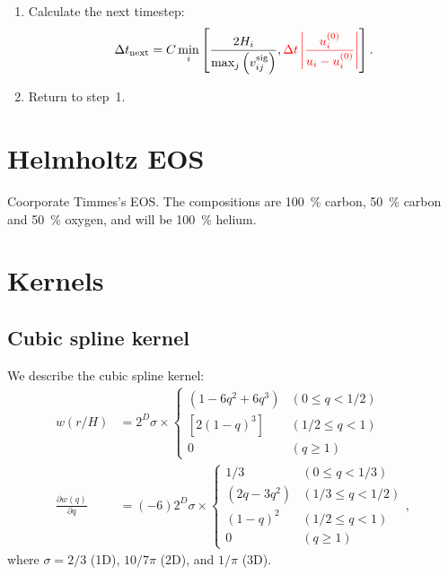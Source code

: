 \documentclass[fleqn,dvipdfmx]{article}
\newcommand{\redtext}[1]{\textcolor{red}{#1}}
\begin{document}
\begin{enumerate}
\item Calculate the next timestep:
  \begin{align}
    \Delta t_{\rm next} = C \min_i \left[ \frac{2H_i}{\max_j \left(
        v_{ij}^{\rm sig} \right) }, \redtext{\Delta t \left|
        \frac{u_i^{(0)}}{u_i-u_i^{(0)}} \right|} \right].
  \end{align}

\item Return to step~1.
\end{enumerate}

\section{Helmholtz EOS}

Coorporate Timmes's EOS. The compositions are 100~\% carbon, 50~\%
carbon and 50~\% oxygen, and will be 100~\% helium.

\appendix

\section{Kernels}
\label{sec:kernels}

\subsection{Cubic spline kernel}

We describe the cubic spline kernel:
\begin{align}
  w(r/H) &= 2^D \sigma \times \left\{
  \begin{array}{ll}
    \left( 1 - 6 q^2 + 6 q^3 \right) & (0 \le q < 1/2) \\
    \left[ 2 (1 - q)^3 \right] & (1/2 \le q < 1) \\
    0 & (q \ge 1)
  \end{array}
  \right. \label{eq:cubicspline0-1} \\
  \frac{\partial w(q)}{\partial q} &= (-6) 2^D \sigma
  \times \left\{
  \begin{array}{ll}
    1/3 & (0 \le q < 1/3) \\
    \left(2q - 3q^2 \right) & (1/3 \le q < 1/2) \\
    (1 - q)^2 & (1/2 \le q < 1) \\
    0 & (q \ge 1)
  \end{array}
  \right., \label{eq:cubicspline0-2}
\end{align}
where $\sigma = 2/3$ (1D), $10/7\pi$ (2D), and $1/\pi$ (3D).
\end{document}
